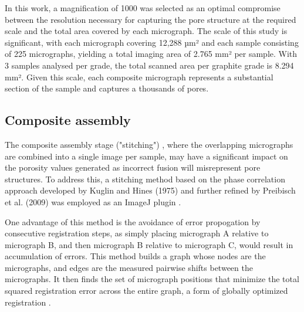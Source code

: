 \documentclass[3p,twocolumn]{elsarticle}
\begin{document}
In this work, a magnification of 1000 was selected as an optimal compromise
between the resolution necessary for capturing the pore structure at the
required scale and the total area covered by each micrograph. The scale of this
study is significant, with each micrograph covering 12,288 µm² and each sample
consisting of 225 micrographs, yielding a total imaging area of 2.765 mm² per
sample. With 3 samples analysed per grade, the total scanned area per graphite grade is
8.294 mm². Given this scale, each composite micrograph represents a substantial
section of the sample and captures a thousands of pores.

\subsection{Composite assembly}

The composite assembly stage ("stitching") , where the overlapping micrographs
are combined into a single image per sample, may have a significant impact on
the porosity values generated as incorrect fusion will misrepresent pore
structures. To address this, a stitching method based on the phase correlation
approach developed by Kuglin and Hines (1975) and further refined by Preibisch
et al. (2009) was employed as an ImageJ plugin \citep{Kuglin1975,
Preibisch2009}.
	
One advantage of this method is the avoidance of error propogation by
consecutive registration steps, as simply placing micrograph A relative to
micrograph B, and then micrograph B relative to micrograph C, would result in
accumulation of errors. This method builds a graph whose nodes are the
micrographs, and edges are the measured pairwise shifts between the micrographs.
It then finds the set of micrograph positions that minimize the total squared
registration error across the entire graph, a form of globally optimized
registration \citep{Preibisch2009}.
\end{document}
